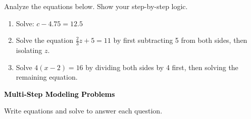 \documentclass[12pt, letterpaper, fleqn]{article}
\begin{document}
\noindent
Analyze the equations below. Show your step-by-step logic.

\vspace{3mm}

\begin{enumerate}[itemsep=2.2cm, leftmargin=0.6cm]

\item Solve: $c - 4.75 = 12.5$

\vspace{2cm}

\item Solve the equation $\frac{2}{3}z + 5 = 11$ by first subtracting 5 from both sides, then isolating $z$.

\vspace{2cm}

\item Solve $4(x - 2) = 16$ by dividing both sides by 4 first, then solving the remaining equation.

\vspace{2cm}

\end{enumerate}

\newpage

\begin{tcolorbox}[colback=black!10]
\large\textcolor{black}{\textbf{Multi-Step Modeling Problems}}
\end{tcolorbox}

\noindent
Write equations and solve to answer each question.

\vspace{3mm}
\end{document}
